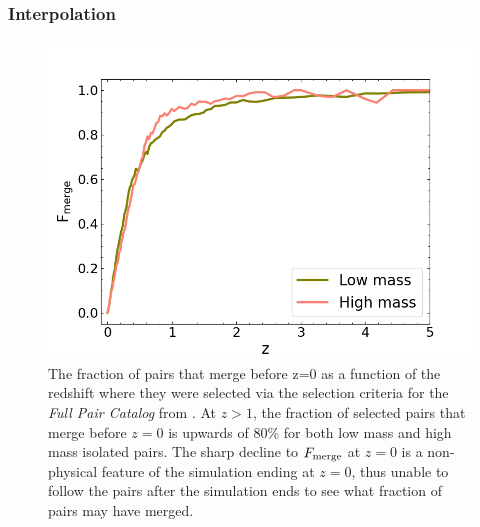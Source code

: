 \documentclass[twocolumn]{aastex631}
\newcommand{\paircat}{\textit{Full Pair Catalog}}
\begin{document}
\subsubsection{Interpolation}
\begin{figure}[htb]
    \centering
    \includegraphics[width=\columnwidth]{plots/bet-on-it/1_fmerge_comp.png}
    \caption{The fraction of pairs that merge before z=0 as a function of the redshift where they were selected via the selection criteria for the \paircat{} from \citet{Chamberlain2024}. At $z>1$, the fraction of selected pairs that merge before $z=0$ is upwards of 80\% for both low mass and high mass isolated pairs. The sharp decline to $F_{\rm merge}$ at $z=0$ is a non-physical feature of the simulation ending at $z=0$, thus unable to follow the pairs after the simulation ends to see what fraction of pairs may have merged.}
    \label{fig:fmerge}
\end{figure}
\end{document}
